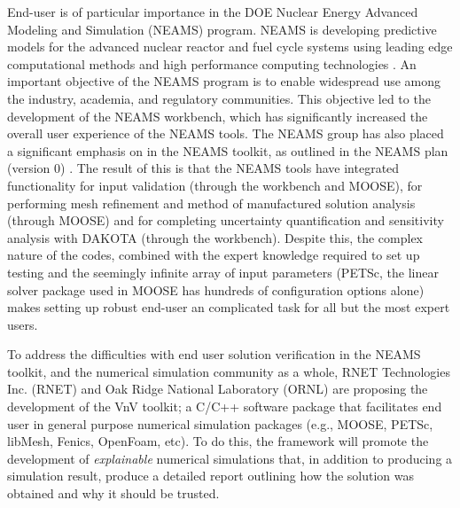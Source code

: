 End-user \VV is of particular importance in the DOE Nuclear Energy Advanced Modeling and Simulation (NEAMS) program. NEAMS is developing predictive models for the advanced nuclear reactor and fuel cycle systems using leading edge computational methods and high performance computing technologies \cite{NEAMS}. An important objective of the NEAMS program is to enable widespread use among the industry, academia, and regulatory communities\cite{NEAMS}. This objective led to the development of the NEAMS workbench, which has significantly increased the overall user experience of the NEAMS tools. The NEAMS group has also placed a significant emphasis on \VV in the NEAMS toolkit, as outlined in the NEAMS \VV plan (version 0) \cite{neams-vv}. The result of this is that the NEAMS tools have integrated functionality for input validation (through the workbench and MOOSE), for performing mesh refinement and method of manufactured solution analysis (through MOOSE) and for completing uncertainty quantification and sensitivity analysis with DAKOTA (through the workbench). Despite this, the complex nature of the codes, combined with the expert knowledge required to set up \VV testing and the seemingly infinite array of input parameters (PETSc, the linear solver package used in MOOSE has hundreds of configuration options alone) makes setting up robust end-user \VV an complicated task for all but the most expert users.   

To address the difficulties with end user solution verification in the NEAMS toolkit, and the numerical simulation community as a whole, RNET Technologies Inc. (RNET) and Oak Ridge National Laboratory (ORNL) are proposing the development of the VnV toolkit; a C/C++ software package that facilitates end user \VV in general purpose numerical simulation packages (e.g., MOOSE, PETSc, libMesh, Fenics, OpenFoam, etc). To do this, the framework will promote the development of \emph{explainable} numerical simulations that, in addition to producing a simulation result, produce a detailed report outlining how the solution was obtained and why it should be trusted. 



